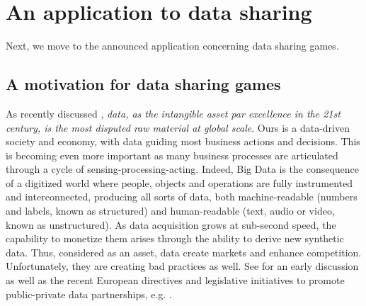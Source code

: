 
\section{An application to data sharing}\label{sec:ds}
Next, we  move to the announced application concerning data sharing games.

\subsection{A motivation for data sharing games}

As recently discussed \parencite{wolfram}, {\em data, as the intangible asset par excellence in the 21st century, is the most disputed raw material at global scale}. Ours is a data-driven society and economy,
with  data guiding most business actions and decisions. 
This is becoming even more important as
many business processes are articulated through a 
cycle of sensing-processing-acting. Indeed, Big Data is the
consequence of a digitized world where people, objects and operations are fully instrumented and interconnected, producing all sorts of data, both machine-readable (numbers and labels, known as
structured) and human-readable (text, audio or video, known as unstructured).
As data acquisition grows at sub-second speed, the capability to monetize
them arises through the ability to derive new synthetic data. 
Thus, considered as an asset, data create markets and enhance 
competition. Unfortunately, they are creating bad practices as well.
See \parencite{share} for an early discussion 
as well as the 
recent European directives and legislative initiatives to 
promote public-private data partnerships, e.g. \textcite{europe1}.

